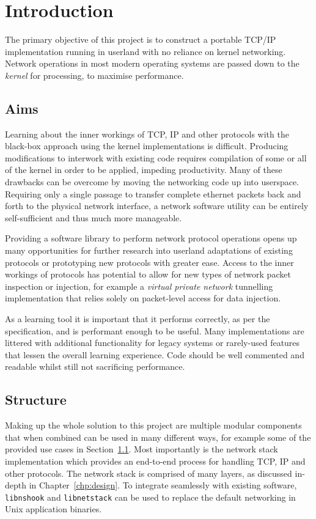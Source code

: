 
\chapter{Introduction}\label{chp:intro}
The primary objective of this project is to construct a portable TCP/IP implementation running in userland with no reliance on kernel networking. Network operations in most modern operating systems are passed down to the \textit{kernel} for processing, to maximise performance.

    \section{Aims}\label{sec:aims}
    Learning about the inner workings of TCP, IP and other protocols with the black-box approach using the kernel implementations is difficult. Producing modifications to interwork with existing code requires compilation of some or all of the kernel in order to be applied, impeding productivity. Many of these drawbacks can be overcome by moving the networking code up into userspace. Requiring only a single passage to transfer complete ethernet packets back and forth to the physical network interface, a network software utility can be entirely self-sufficient and thus much more manageable.

    Providing a software library to perform network protocol operations opens up many opportunities for further research into userland adaptations of existing protocols or prototyping new protocols with greater ease. Access to the inner workings of protocols has potential to allow for new types of network packet inspection or injection, for example a \textit{virtual private network} tunnelling implementation that relies solely on packet-level access for data injection.

    As a learning tool it is important that it performs correctly, as per the specification, and is performant enough to be useful. Many implementations are littered with additional functionality for legacy systems or rarely-used features that lessen the overall learning experience. Code should be well commented and readable whilst still not sacrificing performance.

    \section{Structure}
    Making up the whole solution to this project are multiple modular components that when combined can be used in many different ways, for example some of the provided use cases in Section~\ref{sec:aims}.
    Most importantly is the network stack implementation which provides an end-to-end process for handling TCP, IP and other protocols. The network stack is comprised of many layers, as discussed in-depth in Chapter~\ref{chp:design}. To integrate seamlessly with existing software, \texttt{libnshook} and \texttt{libnetstack} can be used to replace the default networking in Unix application binaries.

